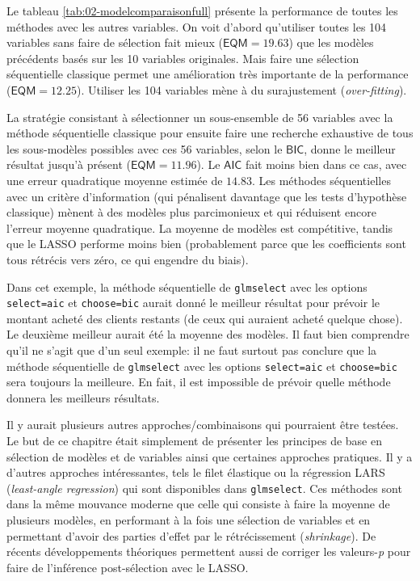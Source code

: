 \documentclass[
  11pt,
  letterpaper,
]{book}
\theoremstyle{definition}
\theoremstyle{definition}
\theoremstyle{definition}
\theoremstyle{definition}
\theoremstyle{remark}
\begin{document}
Le tableau \ref{tab:02-modelcomparaisonfull} présente la performance de toutes les méthodes avec les autres variables. On voit d'abord qu'utiliser toutes les 104 variables sans faire de sélection fait mieux (\(\mathsf{EQM}=19.63\)) que les modèles précédents basés sur les 10 variables originales. Mais faire une sélection séquentielle classique permet une amélioration très importante de la performance (\(\mathsf{EQM}=12.25\)). Utiliser les 104 variables mène à du surajustement (\emph{over-fitting}).

La stratégie consistant à sélectionner un sous-ensemble de 56 variables avec la méthode séquentielle classique pour ensuite faire une recherche exhaustive de tous les sous-modèles possibles avec ces 56 variables, selon le \(\mathsf{BIC}\), donne le meilleur résultat jusqu'à présent (\(\mathsf{EQM}=11.96\)). Le \(\mathsf{AIC}\) fait moins bien dans ce cas, avec une erreur quadratique moyenne estimée de \(14.83\).
Les méthodes séquentielles avec un critère d'information (qui pénalisent davantage que les tests d'hypothèse classique) mènent à des modèles plus parcimonieux et qui réduisent encore l'erreur moyenne quadratique. La moyenne de modèles est compétitive, tandis que le LASSO performe moins bien (probablement parce que les coefficients sont tous rétrécis vers zéro, ce qui engendre du biais).

Dans cet exemple, la méthode séquentielle de \texttt{glmselect} avec les options \texttt{select=aic} et \texttt{choose=bic} aurait donné le meilleur résultat pour prévoir le montant acheté des clients restants (de ceux qui auraient acheté quelque chose). Le deuxième meilleur aurait été la moyenne des modèles. Il faut bien comprendre qu'il ne s'agit que d'un seul exemple: il ne faut surtout pas conclure que la méthode séquentielle de \texttt{glmselect} avec les options \texttt{select=aic} et \texttt{choose=bic} sera toujours la meilleure. En fait, il est impossible de prévoir quelle méthode donnera les meilleurs résultats.

Il y aurait plusieurs autres approches/combinaisons qui pourraient être testées. Le but de ce chapitre était simplement de présenter les principes de base en sélection de modèles et de variables ainsi que certaines approches pratiques. Il y a d'autres approches intéressantes, tels le filet élastique ou la régression LARS (\emph{least-angle regression}) qui sont disponibles dans \texttt{glmselect}. Ces méthodes sont dans la même mouvance moderne que celle qui consiste à faire la moyenne de plusieurs modèles, en performant à la fois une sélection de variables et en permettant d'avoir des parties d'effet par le rétrécissement (\emph{shrinkage}). De récents développements théoriques permettent aussi de corriger les valeurs-\emph{p} pour faire de l'inférence post-sélection avec le LASSO.
\end{document}
